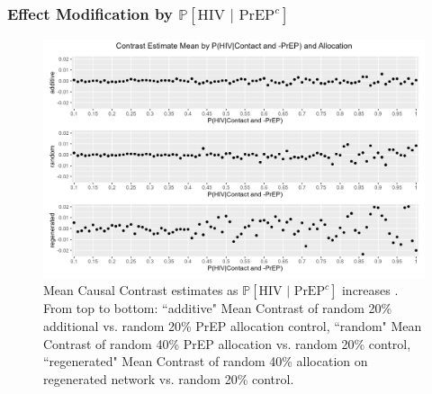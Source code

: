 \documentclass{article}
\theoremstyle{definition}
\begin{document}
\subsubsection{Effect Modification by $\mathbb{P}\left[\text{HIV } \vert \text{ PrEP}^{c}\right]$}
\begin{figure}[H]
    \centering
    \includegraphics[scale=0.75]{Figures/p1 Mean plots.png}
    \caption{Mean Causal Contrast estimates as $\mathbb{P}\left[\text{HIV } \vert \text{ PrEP}^{c}\right]$ increases . From top to bottom: ``additive" Mean Contrast of random 20\% additional vs. random 20\% PrEP allocation control, ``random" Mean Contrast of random 40\% PrEP allocation vs. random 20\% control, ``regenerated" Mean Contrast of random 40\% allocation on regenerated network vs. random 20\% control.}
    \label{fig:Figure 13}
\end{figure}
\end{document}
